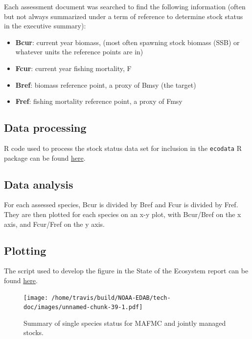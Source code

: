 \documentclass[
]{book}
\begin{document}
Each assessment document was searched to find the following information (often but not always summarized under a term of reference to determine stock status in the executive summary):

\begin{itemize}
\item
  \textbf{Bcur}: current year biomass, (most often spawning stock biomass (SSB) or whatever units the reference points are in)
\item
  \textbf{Fcur}: current year fishing mortality, F
\item
  \textbf{Bref}: biomass reference point, a proxy of Bmsy (the target)
\item
  \textbf{Fref}: fishing mortality reference point, a proxy of Fmsy
\end{itemize}

\hypertarget{data-processing-25}{%
\subsection{Data processing}\label{data-processing-25}}

R code used to process the stock status data set for inclusion in the \texttt{ecodata} R package can be found \href{https://github.com/NOAA-EDAB/ecodata/blob/master/data-raw/get_stocks.R}{here}.

\hypertarget{data-analysis-33}{%
\subsection{Data analysis}\label{data-analysis-33}}

For each assessed species, Bcur is divided by Bref and Fcur is divided by Fref. They are then plotted for each species on an x-y plot, with Bcur/Bref on the x axis, and Fcur/Fref on the y axis.

\hypertarget{plotting-28}{%
\subsection{Plotting}\label{plotting-28}}

The script used to develop the figure in the State of the Ecosystem report can be found \href{https://github.com/NOAA-EDAB/ecodata/blob/master/chunk-scripts/human_dimensions.Rmd-stock-status1.R}{here}.

\begin{figure}
\centering
\texttt{[image: /home/travis/build/NOAA-EDAB/tech-doc/images/unnamed-chunk-39-1.pdf]}
\caption{\label{fig:unnamed-chunk-39}Summary of single species status for MAFMC and jointly managed stocks.}
\end{figure}
\end{document}
